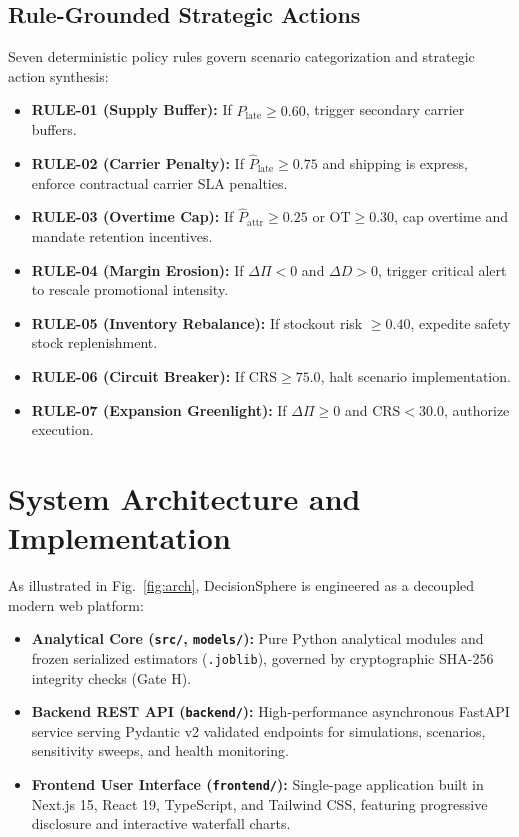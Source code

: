 \documentclass[10pt,conference]{IEEEtran}
\begin{document}
\subsection{Rule-Grounded Strategic Actions}
Seven deterministic policy rules govern scenario categorization and strategic action synthesis:
\begin{itemize}
    \item \textbf{RULE-01 (Supply Buffer):} If $\hat{P}_{\text{late}} \ge 0.60$, trigger secondary carrier buffers.
    \item \textbf{RULE-02 (Carrier Penalty):} If $\hat{P}_{\text{late}} \ge 0.75$ and shipping is express, enforce contractual carrier SLA penalties.
    \item \textbf{RULE-03 (Overtime Cap):} If $\hat{P}_{\text{attr}} \ge 0.25$ or $\text{OT} \ge 0.30$, cap overtime and mandate retention incentives.
    \item \textbf{RULE-04 (Margin Erosion):} If $\Delta \Pi < 0$ and $\Delta D > 0$, trigger critical alert to rescale promotional intensity.
    \item \textbf{RULE-05 (Inventory Rebalance):} If stockout risk $\ge 0.40$, expedite safety stock replenishment.
    \item \textbf{RULE-06 (Circuit Breaker):} If $\text{CRS} \ge 75.0$, halt scenario implementation.
    \item \textbf{RULE-07 (Expansion Greenlight):} If $\Delta \Pi \ge 0$ and $\text{CRS} < 30.0$, authorize execution.
\end{itemize}

\section{System Architecture and Implementation}

As illustrated in Fig.~\ref{fig:arch}, DecisionSphere is engineered as a decoupled modern web platform:
\begin{itemize}
    \item \textbf{Analytical Core (\texttt{src/}, \texttt{models/}):} Pure Python analytical modules and frozen serialized estimators (\texttt{.joblib}), governed by cryptographic SHA-256 integrity checks (Gate H).
    \item \textbf{Backend REST API (\texttt{backend/}):} High-performance asynchronous FastAPI service serving Pydantic v2 validated endpoints for simulations, scenarios, sensitivity sweeps, and health monitoring.
    \item \textbf{Frontend User Interface (\texttt{frontend/}):} Single-page application built in Next.js 15, React 19, TypeScript, and Tailwind CSS, featuring progressive disclosure and interactive waterfall charts.
\end{itemize}
\end{document}
